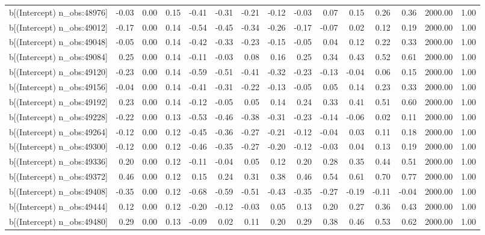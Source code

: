 \begin{table}[ht]
\begin{tabular}{rrrrrrrrrrrrrrr}
  b[(Intercept) n\_obs:48976] & -0.03 & 0.00 & 0.15 & -0.41 & -0.31 & -0.21 & -0.12 & -0.03 & 0.07 & 0.15 & 0.26 & 0.36 & 2000.00 & 1.00 \\ 
  b[(Intercept) n\_obs:49012] & -0.17 & 0.00 & 0.14 & -0.54 & -0.45 & -0.34 & -0.26 & -0.17 & -0.07 & 0.02 & 0.12 & 0.19 & 2000.00 & 1.00 \\ 
  b[(Intercept) n\_obs:49048] & -0.05 & 0.00 & 0.14 & -0.42 & -0.33 & -0.23 & -0.15 & -0.05 & 0.04 & 0.12 & 0.22 & 0.33 & 2000.00 & 1.00 \\ 
  b[(Intercept) n\_obs:49084] & 0.25 & 0.00 & 0.14 & -0.11 & -0.03 & 0.08 & 0.16 & 0.25 & 0.34 & 0.43 & 0.52 & 0.61 & 2000.00 & 1.00 \\ 
  b[(Intercept) n\_obs:49120] & -0.23 & 0.00 & 0.14 & -0.59 & -0.51 & -0.41 & -0.32 & -0.23 & -0.13 & -0.04 & 0.06 & 0.15 & 2000.00 & 1.00 \\ 
  b[(Intercept) n\_obs:49156] & -0.04 & 0.00 & 0.14 & -0.41 & -0.31 & -0.22 & -0.13 & -0.05 & 0.05 & 0.14 & 0.23 & 0.33 & 2000.00 & 1.00 \\ 
  b[(Intercept) n\_obs:49192] & 0.23 & 0.00 & 0.14 & -0.12 & -0.05 & 0.05 & 0.14 & 0.24 & 0.33 & 0.41 & 0.51 & 0.60 & 2000.00 & 1.00 \\ 
  b[(Intercept) n\_obs:49228] & -0.22 & 0.00 & 0.13 & -0.53 & -0.46 & -0.38 & -0.31 & -0.23 & -0.14 & -0.06 & 0.02 & 0.11 & 2000.00 & 1.00 \\ 
  b[(Intercept) n\_obs:49264] & -0.12 & 0.00 & 0.12 & -0.45 & -0.36 & -0.27 & -0.21 & -0.12 & -0.04 & 0.03 & 0.11 & 0.18 & 2000.00 & 1.00 \\ 
  b[(Intercept) n\_obs:49300] & -0.12 & 0.00 & 0.12 & -0.46 & -0.35 & -0.27 & -0.20 & -0.12 & -0.03 & 0.04 & 0.13 & 0.19 & 2000.00 & 1.00 \\ 
  b[(Intercept) n\_obs:49336] & 0.20 & 0.00 & 0.12 & -0.11 & -0.04 & 0.05 & 0.12 & 0.20 & 0.28 & 0.35 & 0.44 & 0.51 & 2000.00 & 1.00 \\ 
  b[(Intercept) n\_obs:49372] & 0.46 & 0.00 & 0.12 & 0.15 & 0.24 & 0.31 & 0.38 & 0.46 & 0.54 & 0.61 & 0.70 & 0.77 & 2000.00 & 1.00 \\ 
  b[(Intercept) n\_obs:49408] & -0.35 & 0.00 & 0.12 & -0.68 & -0.59 & -0.51 & -0.43 & -0.35 & -0.27 & -0.19 & -0.11 & -0.04 & 2000.00 & 1.00 \\ 
  b[(Intercept) n\_obs:49444] & 0.12 & 0.00 & 0.12 & -0.20 & -0.12 & -0.03 & 0.05 & 0.13 & 0.20 & 0.27 & 0.36 & 0.43 & 2000.00 & 1.00 \\ 
  b[(Intercept) n\_obs:49480] & 0.29 & 0.00 & 0.13 & -0.09 & 0.02 & 0.11 & 0.20 & 0.29 & 0.38 & 0.46 & 0.53 & 0.62 & 2000.00 & 1.00 \\ 

\end{tabular}
\end{table}

